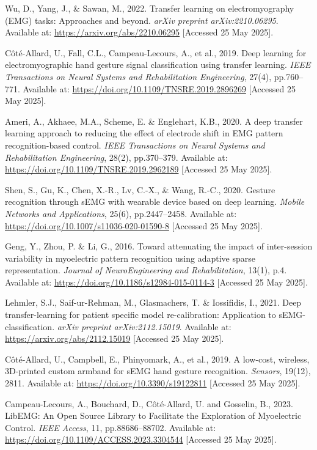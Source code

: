 \begin{multicols}{2}
\begin{thebibliography}{99}
Wu, D., Yang, J., \& Sawan, M., 2022. Transfer learning on electromyography (EMG) tasks: Approaches and beyond. \textit{arXiv preprint arXiv:2210.06295}. Available at: \url{https://arxiv.org/abs/2210.06295} [Accessed 25 May 2025].

Côté-Allard, U., Fall, C.L., Campeau-Lecours, A., et al., 2019. Deep learning for electromyographic hand gesture signal classification using transfer learning. \textit{IEEE Transactions on Neural Systems and Rehabilitation Engineering}, 27(4), pp.760–771. Available at: \url{https://doi.org/10.1109/TNSRE.2019.2896269} [Accessed 25 May 2025].

Ameri, A., Akhaee, M.A., Scheme, E. \& Englehart, K.B., 2020. A deep transfer learning approach to reducing the effect of electrode shift in EMG pattern recognition-based control. \textit{IEEE Transactions on Neural Systems and Rehabilitation Engineering}, 28(2), pp.370–379. Available at: \url{https://doi.org/10.1109/TNSRE.2019.2962189} [Accessed 25 May 2025].

Shen, S., Gu, K., Chen, X.-R., Lv, C.-X., \& Wang, R.-C., 2020. Gesture recognition through sEMG with wearable device based on deep learning. \textit{Mobile Networks and Applications}, 25(6), pp.2447–2458. Available at: \url{https://doi.org/10.1007/s11036-020-01590-8} [Accessed 25 May 2025].

Geng, Y., Zhou, P. \& Li, G., 2016. Toward attenuating the impact of inter-session variability in myoelectric pattern recognition using adaptive sparse representation. \textit{Journal of NeuroEngineering and Rehabilitation}, 13(1), p.4. Available at: \url{https://doi.org/10.1186/s12984-015-0114-3} [Accessed 25 May 2025].

Lehmler, S.J., Saif-ur-Rehman, M., Glasmachers, T. \& Iossifidis, I., 2021. Deep transfer-learning for patient specific model re-calibration: Application to sEMG-classification. \textit{arXiv preprint arXiv:2112.15019}. Available at: \url{https://arxiv.org/abs/2112.15019} [Accessed 25 May 2025].

Côté-Allard, U., Campbell, E., Phinyomark, A., et al., 2019. A low-cost, wireless, 3D-printed custom armband for sEMG hand gesture recognition. \textit{Sensors}, 19(12), 2811. Available at: \url{https://doi.org/10.3390/s19122811} [Accessed 25 May 2025].

Campeau-Lecours, A., Bouchard, D., Côté-Allard, U. and Gosselin, B., 2023. LibEMG: An Open Source Library to Facilitate the Exploration of Myoelectric Control. \textit{IEEE Access}, 11, pp.88686–88702. Available at: \url{https://doi.org/10.1109/ACCESS.2023.3304544} [Accessed 25 May 2025].


\end{thebibliography}
\end{multicols}
